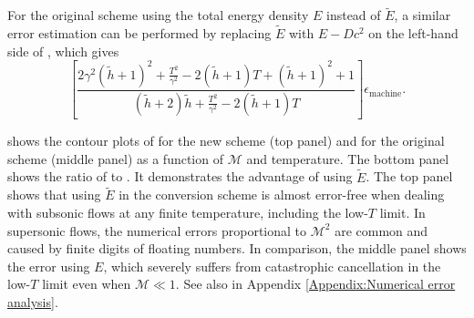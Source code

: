 For the original scheme using the total energy density $E$ instead of $\tilde{E}$, a similar error estimation can be performed by replacing $\tilde{E}$ with $E-Dc^2$ on the left-hand side of , which gives
\begin{equation}
    \left[\frac{2\gamma^2\left(\tilde{h}+1\right)^2+\frac{T^2}{\gamma^2}-2\left(\tilde{h}+1\right)T+\left(\tilde{h}+1\right)^2+1}{\left(\tilde{h}+2\right)\tilde{h}+\frac{T^2}{\gamma^2}-2\left(\tilde{h}+1\right)T}\right]\epsilon_{\text{machine}}.
\label{eq:OriRelativeError}
\end{equation}

 shows the contour plots of  for the new scheme (top panel) and  for the original scheme (middle panel) as a function of $\mathscr{M}$ and temperature. The bottom panel shows the ratio of  to . It demonstrates the advantage of using $\tilde{E}$. The top panel shows that using $\tilde{E}$ in the conversion scheme is almost error-free when dealing with subsonic flows at any finite temperature, including the low-$T$ limit. In supersonic flows, the numerical errors proportional to $\mathscr{M}^2$ are common and caused by finite digits of floating numbers. In comparison, the middle panel shows the error using $E$, which severely suffers from catastrophic cancellation in the low-$T$ limit even when $\mathscr{M}\ll 1$. See also  in Appendix \ref{Appendix:Numerical error analysis}.


